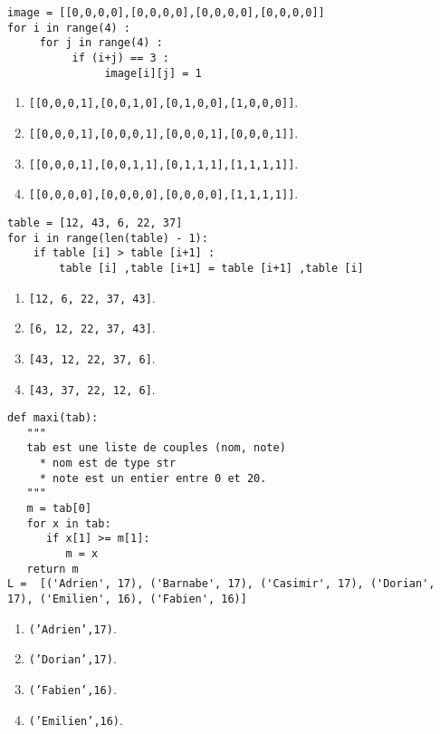 \documentclass[t,10pt]{article}
\begin{document}
\enteteinfo






\begin{lstlisting}
image = [[0,0,0,0],[0,0,0,0],[0,0,0,0],[0,0,0,0]]
for i in range(4) :
     for j in range(4) :
          if (i+j) == 3 :
               image[i][j] = 1
\end{lstlisting}
\begin{enumerate}
\item \texttt{[[0,0,0,1],[0,0,1,0],[0,1,0,0],[1,0,0,0]]}. %
\item \texttt{[[0,0,0,1],[0,0,0,1],[0,0,0,1],[0,0,0,1]]}.
\item \texttt{[[0,0,0,1],[0,0,1,1],[0,1,1,1],[1,1,1,1]]}.
\item \texttt{[[0,0,0,0],[0,0,0,0],[0,0,0,0],[1,1,1,1]]}.
\end{enumerate}


\begin{lstlisting}
table = [12, 43, 6, 22, 37]
for i in range(len(table) - 1):
    if table [i] > table [i+1] :
        table [i] ,table [i+1] = table [i+1] ,table [i]
\end{lstlisting}
\begin{enumerate}
\item \texttt{[12, 6, 22, 37, 43]}. %
\item \texttt{[6, 12, 22, 37, 43]}.
\item \texttt{[43, 12, 22, 37, 6]}.
\item \texttt{[43, 37, 22, 12, 6]}.
\end{enumerate}


\begin{lstlisting}
def maxi(tab):
   """
   tab est une liste de couples (nom, note)
     * nom est de type str
     * note est un entier entre 0 et 20.
   """
   m = tab[0]
   for x in tab:
      if x[1] >= m[1]:
         m = x
   return m
L =  [('Adrien', 17), ('Barnabe', 17), ('Casimir', 17), ('Dorian', 17), ('Emilien', 16), ('Fabien', 16)]
\end{lstlisting}
\begin{enumerate}
\item \texttt{('Adrien',17)}.
\item \texttt{('Dorian',17)}. %
\item \texttt{('Fabien',16)}.
\item \texttt{('Emilien',16)}.
\end{enumerate}
\end{document}

